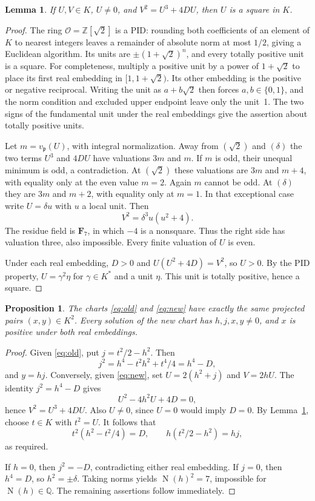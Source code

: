\documentclass[11pt]{article}
\newtheorem{lemma}[theorem]{Lemma}
\newtheorem{proposition}[theorem]{Proposition}
\newcommand{\Q}{\mathbb Q}
\newcommand{\Z}{\mathbb Z}
\newcommand{\N}{\operatorname N}
\begin{document}
\begin{lemma}\label{lem:squares}
If $U,V\in K$, $U\ne0$, and $V^2=U^3+4DU$, then $U$ is a square in $K$.
\end{lemma}
\begin{proof}
The ring $\mathcal O=\Z[\sqrt2]$ is a PID: rounding both coefficients of an element of $K$ to nearest integers leaves a remainder of absolute norm at most $1/2$, giving a Euclidean algorithm. Its units are $\pm(1+\sqrt2)^n$, and every totally positive unit is a square. For completeness, multiply a positive unit by a power of $1+\sqrt2$ to place its first real embedding in $[1,1+\sqrt2)$. Its other embedding is the positive or negative reciprocal. Writing the unit as $a+b\sqrt2$ then forces $a,b\in\{0,1\}$, and the norm condition and excluded upper endpoint leave only the unit~1. The two signs of the fundamental unit under the real embeddings give the assertion about totally positive units.

Let $m=v_{\mathfrak p}(U)$, with integral normalization. Away from $(\sqrt2)$ and $(\delta)$ the two terms $U^3$ and $4DU$ have valuations $3m$ and $m$. If $m$ is odd, their unequal minimum is odd, a contradiction. At $(\sqrt2)$ these valuations are $3m$ and $m+4$, with equality only at the even value $m=2$. Again $m$ cannot be odd. At $(\delta)$ they are $3m$ and $m+2$, with equality only at $m=1$. In that exceptional case write $U=\delta u$ with $u$ a local unit. Then
\[
 V^2=\delta^3u(u^2+4).
\]
The residue field is $\mathbf F_7$, in which $-4$ is a nonsquare. Thus the right side has valuation three, also impossible. Every finite valuation of $U$ is even.

Under each real embedding, $D>0$ and $U(U^2+4D)=V^2$, so $U>0$. By the PID property, $U=\gamma^2\eta$ for $\gamma\in K^*$ and a unit $\eta$. This unit is totally positive, hence a square.
\end{proof}

\begin{proposition}\label{prop:chart}
The charts \eqref{eq:old} and \eqref{eq:new} have exactly the same projected pairs $(x,y)\in K^2$. Every solution of the new chart has $h,j,x,y\ne0$, and $x$ is positive under both real embeddings.
\end{proposition}
\begin{proof}
Given \eqref{eq:old}, put $j=t^2/2-h^2$. Then
\[
 j^2=h^4-t^2h^2+t^4/4=h^4-D,
\]
and $y=hj$. Conversely, given \eqref{eq:new}, set $U=2(h^2+j)$ and $V=2hU$. The identity $j^2=h^4-D$ gives
\[
 U^2-4h^2U+4D=0,
\]
hence $V^2=U^3+4DU$. Also $U\ne0$, since $U=0$ would imply $D=0$. By Lemma~\ref{lem:squares}, choose $t\in K$ with $t^2=U$. It follows that
\[
 t^2(h^2-t^2/4)=D,\qquad h(t^2/2-h^2)=hj,
\]
as required.

If $h=0$, then $j^2=-D$, contradicting either real embedding. If $j=0$, then $h^4=D$, so $h^2=\pm\delta$. Taking norms yields $\N(h)^2=7$, impossible for $\N(h)\in\Q$. The remaining assertions follow immediately.
\end{proof}
\end{document}
